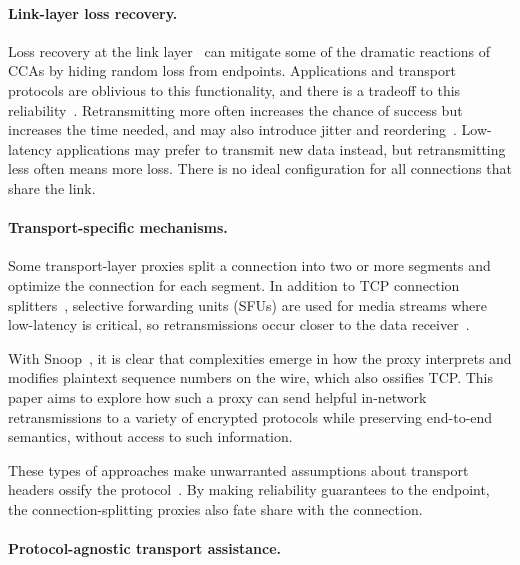 \paragraph{Link-layer loss recovery.}

Loss recovery at the link layer~\cite{3gpp5gstandard,le2022link,ieee80211e} can
mitigate some of the dramatic reactions of CCAs by hiding random loss from
endpoints.
Applications and transport protocols are oblivious to this
functionality, and there is a tradeoff to this reliability~\cite{klingler2018impact,kliazovich2012arqproxy}.
Retransmitting more often increases the chance
of success but increases the time needed, and may also introduce
jitter and reordering~\cite{leung2007overview}.
Low-latency applications may prefer to transmit new data instead, but
retransmitting less often means more loss.
There is no ideal configuration for all connections that share the link.

\paragraph{Transport-specific mechanisms.}

Some transport-layer proxies split a connection into two or more segments
and optimize the connection for each segment. In addition to
TCP connection splitters~\cite{rfc3135,honda2011still,hayes2019mmwave},
selective forwarding units (SFUs) are
used for media streams where low-latency is critical, so retransmissions occur
closer to the data receiver~\cite{rfc7667,andre2018comparative}.

With Snoop~\cite{balakrishnan1995snoop}, it is clear
that complexities emerge in how the proxy interprets
and modifies plaintext sequence numbers on the wire, which also ossifies TCP.
This paper aims to explore how such a proxy can send helpful in-network
retransmissions to a variety of encrypted protocols while preserving
end-to-end semantics, without access to such information.

These types of approaches make unwarranted assumptions about
transport headers ossify the protocol~\cite{papastergiou2017deossifying}.
By making reliability guarantees to the endpoint, the connection-splitting
proxies also fate share with the connection.

\paragraph{Protocol-agnostic transport assistance.}

